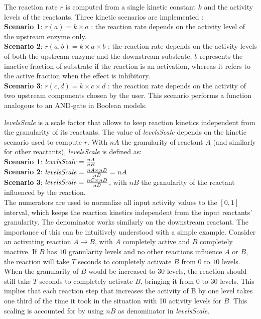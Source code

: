 \documentclass[journal, 10pt]{IEEEtran}
\begin{document}
The reaction rate $r$ is computed from a single kinetic constant $k$ and the activity levels of the reactants. Three kinetic scenarios are implemented :\\
{\bf Scenario 1}: $r(a) = k \times a$ : the reaction rate depends on the activity level of the upstream enzyme only. \\
{\bf Scenario 2}: $r(a, b) = k \times a \times b$ : the reaction rate depends on the activity levels of both the upstream enzyme and the
downstream substrate. $b$ represents the inactive fraction of substrate if the reaction
is an activation, whereas it refers to the active fraction when the effect is inhibitory.\\
{\bf Scenario 3}: $r(c, d) = k \times c \times d$ : the reaction rate depends on the activity of two upstream components chosen by the user. This scenario performs a function analogous to an AND-gate in Boolean models.

{\it levelsScale} is a scale factor that allows to keep reaction kinetics independent from the granularity of its reactants. 
The value of {\it levelsScale} depends on the kinetic scenario used to compute $r$. With $nA$ the granularity of reactant $A$
(and similarly for other reactants), {\it levelsScale} is defined as:\\
{\bf Scenario 1}: $\mbox{\it levelsScale} = \frac{nA}{nB}$\\[1ex]
{\bf Scenario 2}: $\mbox{\it levelsScale} = \frac{nA \times nB}{nB} = nA$\\[1ex]
{\bf Scenario 3}: $\mbox{\it levelsScale} = \frac{nC \times nD}{nB}$, with $nB$ the granularity of the reactant influenced by the reaction.\\
The numerators are used to normalize all input activity values to the $[0, 1]$ interval, which keeps the reaction
kinetics independent from the input reactants' granularity. The denominator works similarly on the downstream reactant.
The importance of this can be intuitively understood with a simple example.
Consider an activating reaction $A \rightarrow B$, with $A$ completely
active and $B$ completely inactive. If $B$ has $10$ granularity levels and no other reactions influence $A$ or $B$,
the reaction will take $T$ seconds to completely activate $B$ from $0$ to $10$ levels. When the granularity of $B$ would be increased to
$30$ levels, the reaction should still take $T$ seconds to completely activate $B$, bringing it
from $0$ to $30$ levels. This implies that each reaction step that increases the activity of B by one level takes one third 
of the time it took in the situation with 10 activity levels for $B$. This scaling is accounted for by using $nB$ as denominator in {\it levelsScale}.
\end{document}

